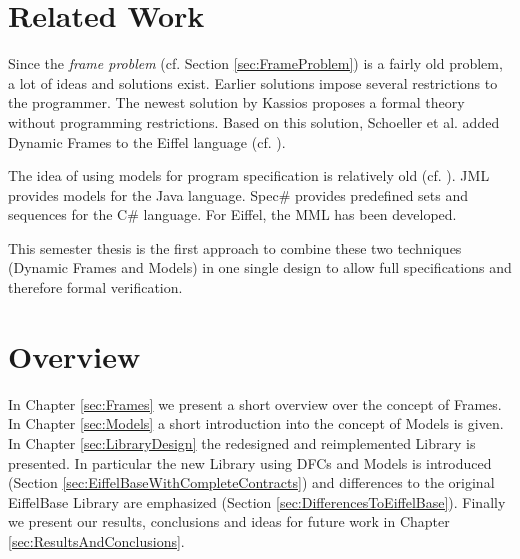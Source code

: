 \section{Related Work}
\label{sec:RelatedWork}

Since the \emph{frame problem} (cf. Section \ref{sec:FrameProblem}) is a fairly old problem, a lot of ideas and solutions exist. Earlier solutions \cite{Mueller01Modular, Leino02Data, Leino04Object} impose several restrictions to the programmer. The newest solution by Kassios \cite{Kassios06Dynamic} proposes a formal theory without programming restrictions. Based on this solution, Schoeller et al. added Dynamic Frames to the Eiffel language (cf. \cite{SchoellerDynamic, Schoeller06Eiffel0}).

The idea of using models for program specification is relatively old (cf. \cite{Hoare72Proof}). JML \cite{Leavens98Preliminary} provides models for the Java language. Spec\# \cite{Barnett04The} provides predefined sets and sequences for the C\# language. For Eiffel, the MML \cite{Widmer04Reusable, Schoeller03Strengthening, Schoeller06Making} has been developed.

This semester thesis is the first approach to combine these two techniques (Dynamic Frames and Models) in one single design to allow full specifications and therefore formal verification.

\section{Overview}
\label{sec:Overview}

In Chapter \ref{sec:Frames} we present a short overview over the concept of Frames. In Chapter \ref{sec:Models} a short introduction into the concept of Models is given. In Chapter \ref{sec:LibraryDesign} the redesigned and reimplemented Library is presented. In particular the new Library using DFCs and Models is introduced (Section \ref{sec:EiffelBaseWithCompleteContracts}) and differences to the original EiffelBase Library are emphasized (Section \ref{sec:DifferencesToEiffelBase}). Finally we present our results, conclusions and ideas for future work in Chapter \ref{sec:ResultsAndConclusions}.
